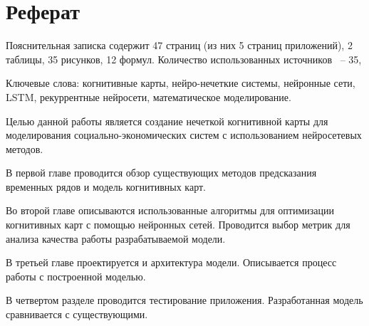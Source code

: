 \chapter*{Реферат}
\thispagestyle{plain}

Пояснительная записка содержит 47 страниц (из них 5 страниц приложений),
2 таблицы, 35 рисунков, 12 формул. Количество использованных источников ~-- 35,

Ключевые слова: когнитивные карты, нейро-нечеткие системы,
нейронные сети, LSTM, рекуррентные нейросети, математическое моделирование.

Целью данной работы является создание нечеткой когнитивной карты для моделирования
социально-экономических систем с использованием нейросетевых методов.

В первой главе проводится обзор существующих методов предсказания временных рядов
и модель когнитивных карт.

Во второй главе описываются использованные алгоритмы для оптимизации
когнитивных карт с помощью нейронных сетей.
Проводится выбор метрик для анализа качества работы разрабатываемой модели.

В третьей главе проектируется и архитектура модели.
Описывается процесс работы с построенной моделью.

В четвертом разделе проводится тестирование приложения.
Разработанная модель сравнивается с существующими.
